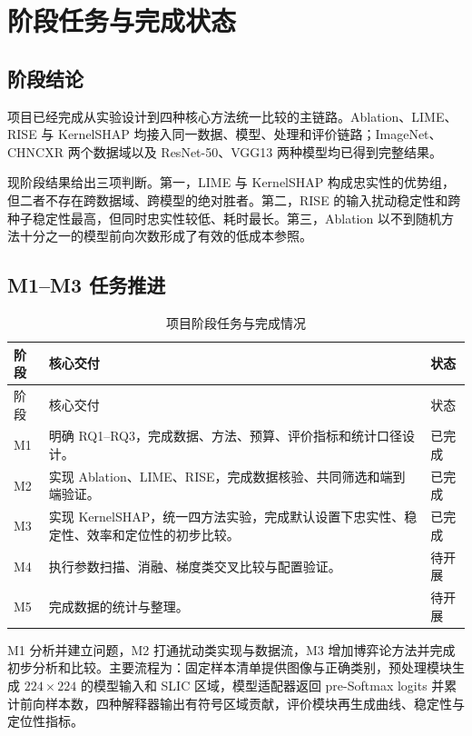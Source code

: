
\chapter{阶段任务与完成状态}

\section{阶段结论}

项目已经完成从实验设计到四种核心方法统一比较的主链路。Ablation、LIME、RISE 与 KernelSHAP 均接入同一数据、模型、处理和评价链路；ImageNet、CHNCXR 两个数据域以及 ResNet-50、VGG13 两种模型均已得到完整结果。

现阶段结果给出三项判断。第一，LIME 与 KernelSHAP 构成忠实性的优势组，但二者不存在跨数据域、跨模型的绝对胜者。第二，RISE 的输入扰动稳定性和跨种子稳定性最高，但同时忠实性较低、耗时最长。第三，Ablation 以不到随机方法十分之一的模型前向次数形成了有效的低成本参照。

\section{M1--M3 任务推进}

{\small
    \begin{xltabular}{\textwidth}{>{\raggedright\arraybackslash}p{1.2cm}X >{\centering\arraybackslash}p{2.2cm}}
        \caption{项目阶段任务与完成情况}\label{tab:milestone-status} \\
        \toprule
        阶段 & 核心交付 & 状态 \\
        \midrule
        \endfirsthead
        \toprule
        阶段 & 核心交付 & 状态 \\
        \midrule
        \endhead
        M1 & 明确 RQ1--RQ3，完成数据、方法、预算、评价指标和统计口径设计。 & 已完成 \\
        M2 & 实现 Ablation、LIME、RISE，完成数据核验、共同筛选和端到端验证。 & 已完成 \\
        M3 & 实现 KernelSHAP，统一四方法实验，完成默认设置下忠实性、稳定性、效率和定位性的初步比较。 & 已完成 \\
        M4 & 执行参数扫描、消融、梯度类交叉比较与配置验证。 & 待开展 \\
        M5 & 完成数据的统计与整理。 & 待开展 \\
        \bottomrule
    \end{xltabular}
}

M1 分析并建立问题，M2 打通扰动类实现与数据流，M3 增加博弈论方法并完成初步分析和比较。主要流程为：固定样本清单提供图像与正确类别，预处理模块生成 $224\times224$ 的模型输入和 SLIC 区域，模型适配器返回 pre-Softmax logits 并累计前向样本数，四种解释器输出有符号区域贡献，评价模块再生成曲线、稳定性与定位性指标。

